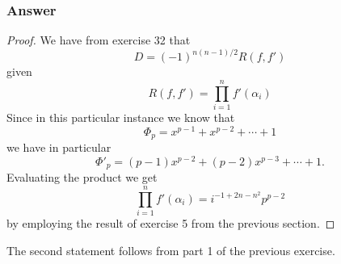 \documentclass[10pt]{article}
\begin{document}
\subsubsection{Answer}
\begin{proof}
We have from exercise 32 that 
\[D = (-1)^{n(n-1)/2}R(f,f')\]
given
\[R(f,f')=\prod_{i=1}^n f'(\alpha_i)\]
Since in this particular instance we know that
\[\Phi_p=x^{p-1}+ x^{p-2}+ \cdots +1\]
we have in particular
\[\Phi'_p = (p-1)x^{p-2}+(p-2)x^{p-3}+ \cdots + 1.\]
Evaluating the product we get
\[\prod_{i=1}^n f'(\alpha_i) = i^{-1+2 n-n^2} p^{p-2}\]
by employing the result of exercise 5 from the previous section.
\end{proof}

The second statement follows from part 1 of the previous exercise.
\end{document}

